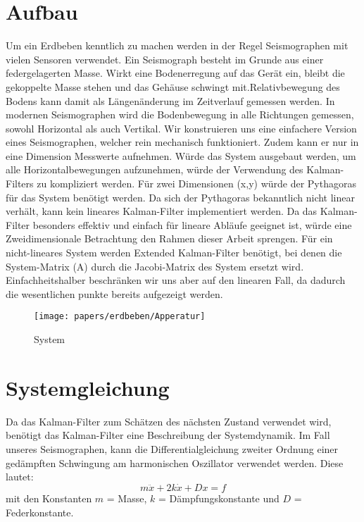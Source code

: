 \section{Aufbau}
Um ein Erdbeben kenntlich zu machen werden in der Regel Seismographen mit vielen Sensoren verwendet. 
Ein Seismograph besteht im Grunde aus einer federgelagerten Masse. Wirkt eine Bodenerregung auf das Gerät ein, bleibt die gekoppelte Masse stehen und das Gehäuse schwingt mit.Relativbewegung des Bodens kann damit als Längenänderung im Zeitverlauf gemessen werden. In modernen Seismographen wird die Bodenbewegung in alle Richtungen gemessen, sowohl Horizontal als auch Vertikal. 
Wir konstruieren uns eine einfachere Version eines Seismographen, welcher rein mechanisch funktioniert. Zudem kann er nur in eine Dimension Messwerte aufnehmen. Würde das System ausgebaut werden, um alle Horizontalbewegungen aufzunehmen, würde der Verwendung des Kalman-Filters zu kompliziert werden. Für zwei Dimensionen (x,y) würde der Pythagoras für das System benötigt werden. Da sich der Pythagoras bekanntlich nicht linear verhält, kann kein lineares Kalman-Filter implementiert werden. Da das Kalman-Filter besonders effektiv und einfach für lineare Abläufe geeignet ist, würde eine Zweidimensionale Betrachtung den Rahmen dieser Arbeit sprengen. Für ein nicht-lineares System werden Extended Kalman-Filter benötigt, bei denen die System-Matrix (A) durch die Jacobi-Matrix des System ersetzt wird. Einfachheitshalber beschränken wir uns aber auf den linearen Fall, da dadurch die wesentlichen punkte bereits aufgezeigt werden. 

\begin{figure}
 \begin{center}
 \texttt{[image: papers/erdbeben/Apperatur]}
 \caption{System}
 \end{center}
\end{figure}



\section{Systemgleichung}
Da das Kalman-Filter zum Schätzen des nächsten Zustand verwendet wird, benötigt das Kalman-Filter eine Beschreibung der Systemdynamik. Im Fall unseres Seismographen, kann die Differentialgleichung zweiter Ordnung einer gedämpften Schwingung am harmonischen Oszillator verwendet werden. Diese lautet:
\begin{equation}
m\ddot x + 2k \dot x + Dx = f
\end{equation}
mit den Konstanten $m$ = Masse, $k$ = Dämpfungskonstante und $D$  = Federkonstante.

